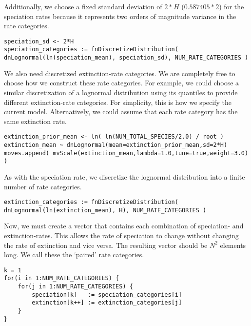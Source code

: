 Additionally, we choose a fixed standard deviation of $2*H$ ($0.587405*2$) for the speciation rates because it represents two orders of magnitude variance in the rate categories.
{\tt \begin{snugshade*}
\begin{lstlisting}
speciation_sd <- 2*H
speciation_categories := fnDiscretizeDistribution( dnLognormal(ln(speciation_mean), speciation_sd), NUM_RATE_CATEGORIES )
\end{lstlisting}
\end{snugshade*}}

We also need discretized extinction-rate categories.
We are completely free to choose how we construct these rate categories.
For example, we could choose a similar discretization of a lognormal distribution using its quantiles to provide different extinction-rate categories.
For simplicity, this is how we specify the current model.
Alternatively, we could assume that each rate category has the same extinction rate.

{\tt \begin{snugshade*}
\begin{lstlisting}
extinction_prior_mean <- ln( ln(NUM_TOTAL_SPECIES/2.0) / root )
extinction_mean ~ dnLognormal(mean=extinction_prior_mean,sd=2*H)
moves.append( mvScale(extinction_mean,lambda=1.0,tune=true,weight=3.0) )
\end{lstlisting}
\end{snugshade*}}
As with the speciation rate, we discretize the lognormal distribution into a finite number of rate categories.
{\tt \begin{snugshade*}
\begin{lstlisting}
extinction_categories := fnDiscretizeDistribution( dnLognormal(ln(extinction_mean), H), NUM_RATE_CATEGORIES )
\end{lstlisting}
\end{snugshade*}}

Now, we must create a vector that contains each combination of speciation- and extinction-rates.
This allows the rate of speciation to change without changing the rate of extinction and vice versa.
The resulting vector should be $N^2$ elements long.
We call these the `paired' rate categories.

{\tt \begin{snugshade*}
\begin{lstlisting}
k = 1
for(i in 1:NUM_RATE_CATEGORIES) {
    for(j in 1:NUM_RATE_CATEGORIES) {
        speciation[k]   := speciation_categories[i]
        extinction[k++] := extinction_categories[j]
    }
}
\end{lstlisting}
\end{snugshade*}}


